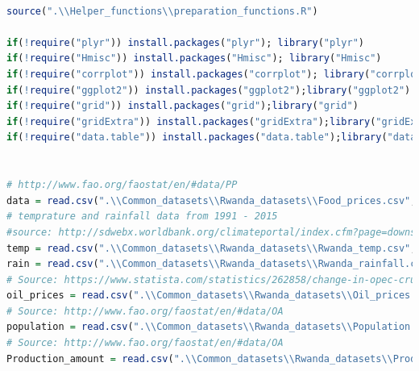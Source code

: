 \documentclass[11pt]{article}
\begin{document}
\begin{lstlisting}[language= R]

source(".\\Helper_functions\\preparation_functions.R")

if(!require("plyr")) install.packages("plyr"); library("plyr")
if(!require("Hmisc")) install.packages("Hmisc"); library("Hmisc")
if(!require("corrplot")) install.packages("corrplot"); library("corrplot")
if(!require("ggplot2")) install.packages("ggplot2");library("ggplot2")
if(!require("grid")) install.packages("grid");library("grid")
if(!require("gridExtra")) install.packages("gridExtra");library("gridExtra")
if(!require("data.table")) install.packages("data.table");library("data.table")


# http://www.fao.org/faostat/en/#data/PP
data = read.csv(".\\Common_datasets\\Rwanda_datasets\\Food_prices.csv", sep = ","  ,stringsAsFactors = FALSE)
# temprature and rainfall data from 1991 - 2015
#source: http://sdwebx.worldbank.org/climateportal/index.cfm?page=downscaled_data_download&menu=historical
temp = read.csv(".\\Common_datasets\\Rwanda_datasets\\Rwanda_temp.csv", head = TRUE, sep = ";", stringsAsFactors = FALSE)
rain = read.csv(".\\Common_datasets\\Rwanda_datasets\\Rwanda_rainfall.csv", head = TRUE, sep = ";", stringsAsFactors = FALSE)
# Source: https://www.statista.com/statistics/262858/change-in-opec-crude-oil-prices-since-1960/
oil_prices = read.csv(".\\Common_datasets\\Rwanda_datasets\\Oil_prices.csv", head = TRUE, sep = ";", stringsAsFactors = FALSE)
# Source: http://www.fao.org/faostat/en/#data/OA
population = read.csv(".\\Common_datasets\\Rwanda_datasets\\Population.csv", head = TRUE, sep = ",", stringsAsFactors = FALSE)
# Source: http://www.fao.org/faostat/en/#data/OA
Production_amount = read.csv(".\\Common_datasets\\Rwanda_datasets\\Production_Amount.csv", head = TRUE, sep = ",", stringsAsFactors = FALSE)

\end{lstlisting}
\end{document}

